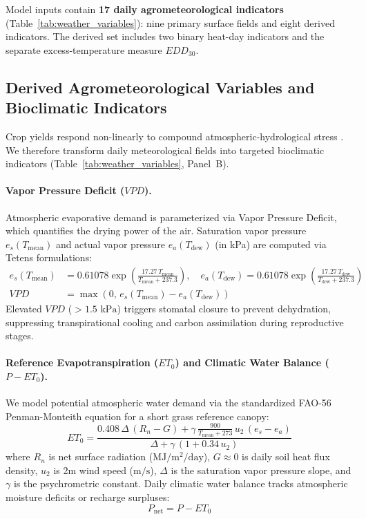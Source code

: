 Model inputs contain \textbf{17 daily agrometeorological indicators} (Table~\ref{tab:weather_variables}): nine primary surface fields and eight derived indicators. The derived set includes two binary heat-day indicators and the separate excess-temperature measure $EDD_{30}$.



\subsection{Derived Agrometeorological Variables and Bioclimatic Indicators}
\label{sec:data_derived_weather}

Crop yields respond non-linearly to compound atmospheric-hydrological stress \citep{Schlenker2009}. We therefore transform daily meteorological fields into targeted bioclimatic indicators (Table~\ref{tab:weather_variables}, Panel~B).

\paragraph{Vapor Pressure Deficit ($VPD$).} Atmospheric evaporative demand is parameterized via Vapor Pressure Deficit, which quantifies the drying power of the air. Saturation vapor pressure $e_s(T_{\text{mean}})$ and actual vapor pressure $e_a(T_{\text{dew}})$ (in kPa) are computed via Tetens formulations:
\begin{align}
    e_s(T_{\text{mean}}) &= 0.61078 \exp\left( \frac{17.27 \, T_{\text{mean}}}{T_{\text{mean}} + 237.3} \right), \quad
    e_a(T_{\text{dew}}) = 0.61078 \exp\left( \frac{17.27 \, T_{\text{dew}}}{T_{\text{dew}} + 237.3} \right) \label{eq:tetens} \\
    VPD &= \max\left(0, \, e_s(T_{\text{mean}}) - e_a(T_{\text{dew}})\right) \label{eq:vpd}
\end{align}
Elevated $VPD$ ($>1.5\text{ kPa}$) triggers stomatal closure to prevent dehydration, suppressing transpirational cooling and carbon assimilation during reproductive stages.

\paragraph{Reference Evapotranspiration ($ET_0$) and Climatic Water Balance ($P - ET_0$).} We model potential atmospheric water demand via the standardized FAO-56 Penman-Monteith equation for a short grass reference canopy:
\begin{equation}
    ET_0 = \frac{0.408 \, \Delta \, (R_n - G) + \gamma \, \frac{900}{T_{\text{mean}} + 273} \, u_2 \, (e_s - e_a)}{\Delta + \gamma \, (1 + 0.34 \, u_2)}
    \label{eq:penman_monteith}
\end{equation}
where $R_n$ is net surface radiation ($\text{MJ}/\text{m}^2/\text{day}$), $G \approx 0$ is daily soil heat flux density, $u_2$ is 2m wind speed ($\text{m/s}$), $\Delta$ is the saturation vapor pressure slope, and $\gamma$ is the psychrometric constant. Daily climatic water balance tracks atmospheric moisture deficits or recharge surpluses:
\begin{equation}
    P_{\text{net}} = P - ET_0
    \label{eq:climatic_balance}
\end{equation}

